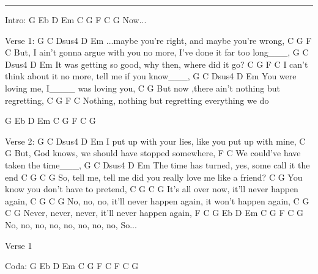 \noindent\rule{\columnwidth}{1pt}

\begin{lstsong}
Intro:
G   Eb   D   Em   C    G      F  C  G             
                                      Now...

Verse 1:
G                 C    Dsus4      D             Em
 ...maybe you're right,       and maybe you're wrong,
C                      G                           F                C
  But, I ain't gonna argue with you no more, I've done it far too long___,
G                     C            Dsus4   D          Em
  It was getting so good, why then,      where did it go?
C           G                      F               C
  I can't think about it no more, tell me if you know___,
G                  C    Dsus4  D             Em
  You were loving me, I____       was loving you,
C                         G  
   But now ,there ain't nothing but regretting,
C              G                   F               C
   Nothing, nothing but regretting   everything we do 

G   Eb   D   Em   C    G      F  C  G

Verse 2:
G                     C         Dsus4  D               Em
  I put up with your lies,  like      you put up with mine,
C                       G
  But, God knows, we should have stopped somewhere,
F                               C
   We could've have taken the time___,
G                 C        Dsus4      D          Em
  The time has turned, yes,     some call it the end
C                       G                     C          G
  So, tell me, tell me did you really love me   like a friend?
C                     G
  You know you don't have to pretend, 
C           G        C                G
  It's all over now,    it'll never happen again,
         C                 G          C             G
No, no, no, it'll never happen again,   it won't happen again,
C        G               C               G
  Never,   never, never,   it'll never happen again, 
F            C               G  Eb  D  Em  C  G  F  C G
No, no, no,  no, no, no, no, no,                        So...

Verse 1

Coda:  G  Eb  D  Em  C  G   F C   F C   G
\end{lstsong}

